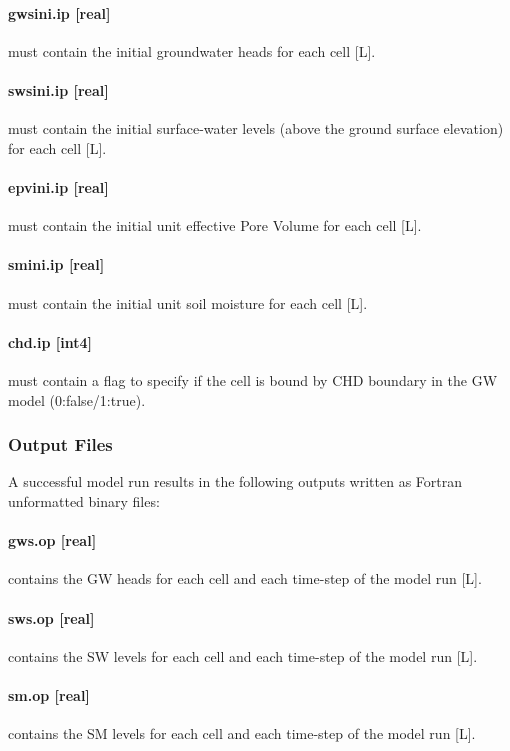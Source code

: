 \paragraph*{gws\textunderscore ini.ip [real]} must contain the initial groundwater heads for each cell [L].

\paragraph*{sws\textunderscore ini.ip [real]} must contain the initial surface-water levels (above the ground surface elevation) for each cell [L].

\paragraph*{epv\textunderscore ini.ip [real]} must contain the initial unit effective Pore Volume for each cell [L].

\paragraph*{sm\textunderscore ini.ip [real]} must contain the initial unit soil moisture for each cell [L].

\paragraph*{chd.ip [int4]} must contain a  flag to specify if the cell is bound by CHD boundary in the GW model (0:false/1:true).


\subsubsection{Output Files}
A successful model run results in the following outputs written as Fortran unformatted binary files:

\paragraph*{gws.op [real]} contains the GW heads for each cell and each time-step of the model run [L].

\paragraph*{sws.op [real]} contains the SW levels for each cell and each time-step of the model run [L].

\paragraph*{sm.op [real]} contains the SM levels for each cell and each time-step of the model run [L].

